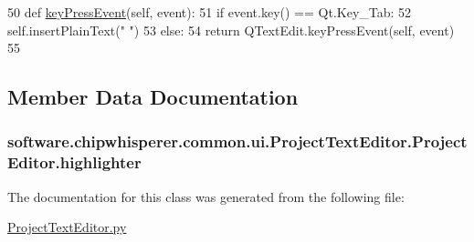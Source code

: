 \begin{DoxyCode}
50     \textcolor{keyword}{def }\hyperlink{classsoftware_1_1chipwhisperer_1_1common_1_1ui_1_1ProjectTextEditor_1_1ProjectEditor_abdf3178b676fc32cc788dc1c1e3b54ea}{keyPressEvent}(self, event):
51         \textcolor{keywordflow}{if} event.key() == Qt.Key\_Tab:
52             self.insertPlainText(\textcolor{stringliteral}{"    "})
53         \textcolor{keywordflow}{else}:
54             \textcolor{keywordflow}{return} QTextEdit.keyPressEvent(self, event)
55 
\end{DoxyCode}


\subsection{Member Data Documentation}
\hypertarget{classsoftware_1_1chipwhisperer_1_1common_1_1ui_1_1ProjectTextEditor_1_1ProjectEditor_aa59d647bfaf0eaa8e18f9dec81e294ac}{}
\subsubsection[{highlighter}]{\setlength{\rightskip}{0pt plus 5cm}software.\+chipwhisperer.\+common.\+ui.\+Project\+Text\+Editor.\+Project\+Editor.\+highlighter}\label{classsoftware_1_1chipwhisperer_1_1common_1_1ui_1_1ProjectTextEditor_1_1ProjectEditor_aa59d647bfaf0eaa8e18f9dec81e294ac}


The documentation for this class was generated from the following file\+:\begin{DoxyCompactItemize}
\item 
\hyperlink{ProjectTextEditor_8py}{Project\+Text\+Editor.\+py}\end{DoxyCompactItemize}
